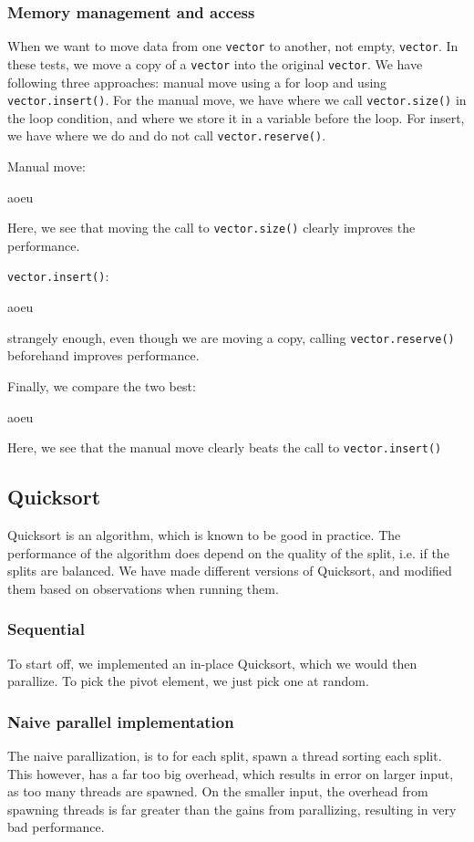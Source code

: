 \subsubsection{Memory management and access}
When we want to move data from one \texttt{vector} to another, not empty,
\texttt{vector}. In these tests, we move a copy of a \texttt{vector} into the
original \texttt{vector}. We have following three approaches: manual move using
a for loop and using \texttt{vector.insert()}. For the manual move, we have
where we call \texttt{vector.size()} in the loop condition, and where we store
it in a variable before the loop. For insert, we have where we do and do not
call \texttt{vector.reserve()}.

Manual move:
\begin{center}
aoeu
\end{center}
Here, we see that moving the call to \texttt{vector.size()} clearly improves
the performance.

\texttt{vector.insert()}:
\begin{center}
aoeu
\end{center}
strangely enough, even though we are moving a copy, calling
\texttt{vector.reserve()} beforehand improves performance.

Finally, we compare the two best:
\begin{center}
aoeu
\end{center}
Here, we see that the manual move clearly beats the call to
\texttt{vector.insert()}

\subsection{Quicksort}
Quicksort is an algorithm, which is known to be good in practice. The
performance of the algorithm does depend on the quality of the split, i.e. if
the splits are balanced. We have made different versions of Quicksort, and
modified them based on observations when running them.

\subsubsection{Sequential}
To start off, we implemented an in-place Quicksort, which we would then
parallize. To pick the pivot element, we just pick one at random.

\subsubsection{Naive parallel implementation}
The naive parallization, is to for each split, spawn a thread sorting each
split. This however, has a far too big overhead, which results in error on
larger input, as too many threads are spawned. On the smaller input, the
overhead from spawning threads is far greater than the gains from parallizing,
resulting in very bad performance.

